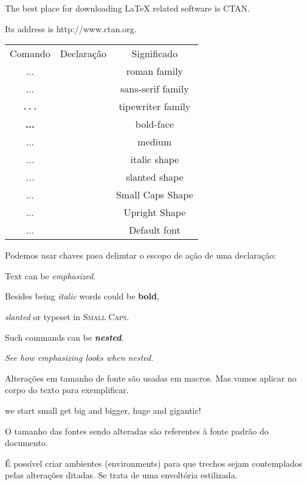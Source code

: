 \documentclass[a4paper, 12pt]{article}
\begin{document}
The best place for downloading LaTeX related software is CTAN.

Its address is \ttfamily http://www.ctan.org\rmfamily.


\begin{tabular}{ c c c }
    Comando         & Declaração  & Significado       \\
    \textrm{...}    & \rmfamily   & roman family      \\
    \textsf{...}    & \sffamily   & sans-serif family \\
    \texttt{...}    & \ttfamily   & tipewriter family \\
    \textbf{...}    & \bfseries   & bold-face         \\
    \textmd{...}    & \mdseries   & medium            \\
    \textit{...}    & \itshape    & italic shape      \\
    \textsl{...}    & \slshape    & slanted shape     \\
    \textsc{...}    & \scshape    & Small Caps Shape  \\
    \textup{...}    & \upshape    & Upright Shape     \\
    \textnormal{...}& \normalfont & Default font      \\
\end{tabular}

Podemos usar chaves paea delimtar o escopo de ação
de uma declaração:

{\sffamily

Text can be {\em emphasized}.

Besides being {\itshape italic} words could be {\bfseries bold},

{\slshape slanted} or typeset in {\scshape Small Caps}.

Such commands can be {\itshape\bfseries nested}.}

{\em See how {\em emphasizing} looks when nested.}

Alterações em tamanho de fonte são usadas em macros.
Mas vamos aplicar no corpo do texto para exemplificar.

\noindent \tiny we \scriptsize start 
\footnotesize \small small
\normalsize get
\large big 
\Large and
\LARGE bigger,
\huge huge and
\Huge gigantic!

O tamanho das fontes sendo alteradas são referentes à fonte padrão do documento.

É possível criar ambientes (environments) para que trechos 
sejam contemplados pelas alterações ditadas.
Se trata de uma envoltória estilizada.
\end{document}
